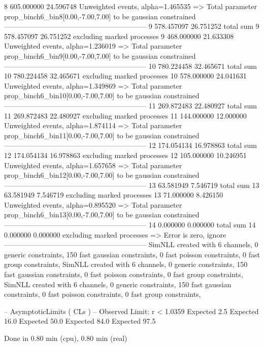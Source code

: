 8          605.000000      24.596748       Unweighted events, alpha=1.465535
  => Total parameter prop_binch6_bin8[0.00,-7.00,7.00] to be gaussian constrained
------------------------------------------------------------
9          578.457097      26.751252       total sum                     
9          578.457097      26.751252       excluding marked processes    
9          468.000000      21.633308       Unweighted events, alpha=1.236019
  => Total parameter prop_binch6_bin9[0.00,-7.00,7.00] to be gaussian constrained
------------------------------------------------------------
10         780.224458      32.465671       total sum                     
10         780.224458      32.465671       excluding marked processes    
10         578.000000      24.041631       Unweighted events, alpha=1.349869
  => Total parameter prop_binch6_bin10[0.00,-7.00,7.00] to be gaussian constrained
------------------------------------------------------------
11         269.872483      22.480927       total sum                     
11         269.872483      22.480927       excluding marked processes    
11         144.000000      12.000000       Unweighted events, alpha=1.874114
  => Total parameter prop_binch6_bin11[0.00,-7.00,7.00] to be gaussian constrained
------------------------------------------------------------
12         174.054134      16.978863       total sum                     
12         174.054134      16.978863       excluding marked processes    
12         105.000000      10.246951       Unweighted events, alpha=1.657658
  => Total parameter prop_binch6_bin12[0.00,-7.00,7.00] to be gaussian constrained
------------------------------------------------------------
13         63.581949       7.546719        total sum                     
13         63.581949       7.546719        excluding marked processes    
13         71.000000       8.426150        Unweighted events, alpha=0.895520
  => Total parameter prop_binch6_bin13[0.00,-7.00,7.00] to be gaussian constrained
------------------------------------------------------------
14         0.000000        0.000000        total sum                     
14         0.000000        0.000000        excluding marked processes    
  => Error is zero, ignore      
------------------------------------------------------------
SimNLL created with 6 channels, 0 generic constraints, 150 fast gaussian constraints, 0 fast poisson constraints, 0 fast group constraints, 
SimNLL created with 6 channels, 0 generic constraints, 150 fast gaussian constraints, 0 fast poisson constraints, 0 fast group constraints, 
SimNLL created with 6 channels, 0 generic constraints, 150 fast gaussian constraints, 0 fast poisson constraints, 0 fast group constraints, 

 -- AsymptoticLimits ( CLs ) --
Observed Limit: r < 1.0359
Expected  2.5%
Expected 16.0%
Expected 50.0%
Expected 84.0%
Expected 97.5%

Done in 0.80 min (cpu), 0.80 min (real)
